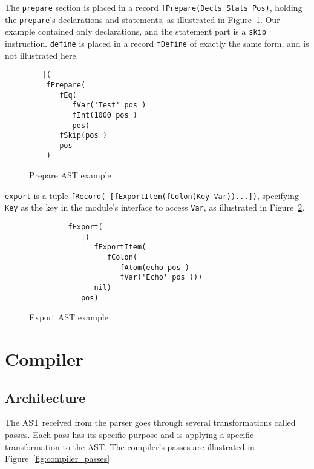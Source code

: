 \documentclass[a4paper]{memoir}
\begin{document}
The \lstinline!prepare! section is placed in a record 
\lstinline!fPrepare(Decls Stats Pos)!, holding the \lstinline!prepare!'s
declarations and statements, as illustrated in
Figure~\ref{fig:functor_example_prepare}.
Our example contained only declarations, and the statement part is a \lstinline!skip! instruction.
\lstinline!define! is placed in a record \lstinline!fDefine! of exactly the same form, and is not illustrated here.

\begin{figure}[ht]
\begin{lstlisting}
   |(
    fPrepare(
       fEq(
          fVar('Test' pos )
          fInt(1000 pos )
          pos)
       fSkip(pos )
       pos
    )

\end{lstlisting}
\caption{Prepare AST example}
\label{fig:functor_example_prepare}
\end{figure}

\lstinline!export! is a tuple 
\lstinline!fRecord( [fExportItem(fColon(Key Var))...])!, specifying
\lstinline!Key! as the key in the module's interface to access
\lstinline!Var!, as illustrated in Figure~\ref{fig:functor_example_export}.

\begin{figure}[h]
\begin{lstlisting}
         fExport(
            |(
               fExportItem(
                  fColon(
                     fAtom(echo pos )
                     fVar('Echo' pos )))
               nil)
            pos)
\end{lstlisting}
\caption{Export AST example}
\label{fig:functor_example_export}
\end{figure}





\chapter{Compiler}
\section{Architecture}
The AST received from the parser goes through several transformations called
passes. Each pass has its specific purpose and is applying a specific
transformation to the AST. The compiler's passes are illustrated in Figure~\ref{fig:compiler_passes}
\end{document}
